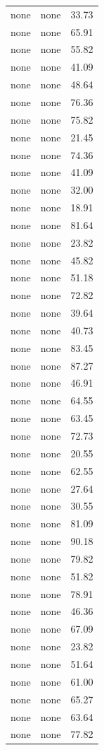 \begin{tabular}{rrr}
none & none & 33.73 \\
none & none & 65.91 \\
none & none & 55.82 \\
none & none & 41.09 \\
none & none & 48.64 \\
none & none & 76.36 \\
none & none & 75.82 \\
none & none & 21.45 \\
none & none & 74.36 \\
none & none & 41.09 \\
none & none & 32.00 \\
none & none & 18.91 \\
none & none & 81.64 \\
none & none & 23.82 \\
none & none & 45.82 \\
none & none & 51.18 \\
none & none & 72.82 \\
none & none & 39.64 \\
none & none & 40.73 \\
none & none & 83.45 \\
none & none & 87.27 \\
none & none & 46.91 \\
none & none & 64.55 \\
none & none & 63.45 \\
none & none & 72.73 \\
none & none & 20.55 \\
none & none & 62.55 \\
none & none & 27.64 \\
none & none & 30.55 \\
none & none & 81.09 \\
none & none & 90.18 \\
none & none & 79.82 \\
none & none & 51.82 \\
none & none & 78.91 \\
none & none & 46.36 \\
none & none & 67.09 \\
none & none & 23.82 \\
none & none & 51.64 \\
none & none & 61.00 \\
none & none & 65.27 \\
none & none & 63.64 \\
none & none & 77.82 \\

\end{tabular}

